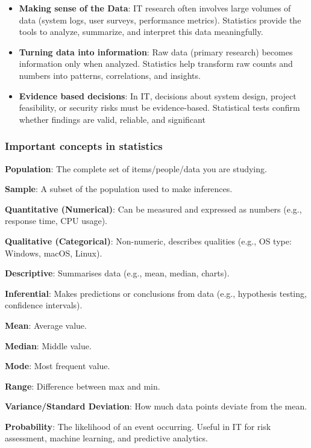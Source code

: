 \begin{itemize}
    \item \textbf{Making sense of the Data}: IT research often involves large volumes of data (system logs, user surveys, performance metrics). Statistics provide the tools to analyze, summarize, and interpret this data meaningfully.
    \item \textbf{Turning data into information}: Raw data (primary research) becomes information only when analyzed. Statistics help transform raw counts and numbers into patterns, correlations, and insights.
    \item \textbf{Evidence based decisions}: In IT, decisions about system design, project feasibility, or security risks must be evidence-based. Statistical tests confirm whether findings are valid, reliable, and significant
\end{itemize}

\subsubsection{Important concepts in statistics}

\indent 

\noindent\textbf{Population}: The complete set of items/people/data you are studying.

\noindent\textbf{Sample}: A subset of the population used to make inferences.

\noindent\textbf{Quantitative (Numerical)}: Can be measured and expressed as numbers (e.g., response time, CPU usage).

\noindent\textbf{Qualitative (Categorical)}: Non-numeric, describes qualities (e.g., OS type: Windows, macOS, Linux).

\noindent\textbf{Descriptive}: Summarises data (e.g., mean, median, charts).

\noindent\textbf{Inferential}: Makes predictions or conclusions from data (e.g., hypothesis testing, confidence intervals).

\noindent\textbf{Mean}: Average value.

\noindent\textbf{Median}: Middle value.

\noindent\textbf{Mode}: Most frequent value.

\noindent\textbf{Range}: Difference between max and min.

\noindent\textbf{Variance/Standard Deviation}: How much data points deviate from the mean.

\noindent\textbf{Probability}: The likelihood of an event occurring. Useful in IT for risk assessment, machine learning, and predictive analytics.

